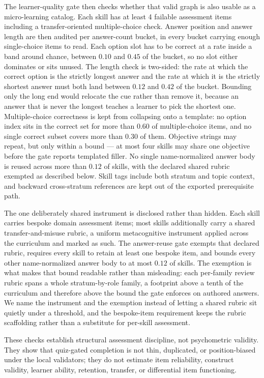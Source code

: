 \documentclass[
  english,
]{article}
\begin{document}
The learner-quality gate then checks whether that valid graph is also
usable as a micro-learning catalog. Each skill has at least 4 failable
assessment items including a transfer-oriented multiple-choice check.
Answer position and answer length are then audited per answer-count
bucket, in every bucket carrying enough single-choice items to read.
Each option slot has to be correct at a rate inside a band around
chance, between \(0.10\) and \(0.45\) of the bucket, so no slot either
dominates or sits unused. The length check is two-sided: the rate at
which the correct option is the strictly longest answer and the rate at
which it is the strictly shortest answer must both land between \(0.12\)
and \(0.42\) of the bucket. Bounding only the long end would relocate
the cue rather than remove it, because an answer that is never the
longest teaches a learner to pick the shortest one. Multiple-choice
correctness is kept from collapsing onto a template: no option index
sits in the correct set for more than \(0.60\) of multiple-choice items,
and no single correct subset covers more than \(0.30\) of them.
Objective strings may repeat, but only within a bound --- at most four
skills may share one objective before the gate reports templated filler.
No single name-normalized answer body is reused across more than
\(0.12\) of skills, with the declared shared rubric exempted as
described below. Skill tags include both stratum and topic context, and
backward cross-stratum references are kept out of the exported
prerequisite path.

The one deliberately shared instrument is disclosed rather than hidden.
Each skill carries bespoke domain assessment items; most skills
additionally carry a shared transfer-and-misuse rubric, a uniform
metacognitive instrument applied across the curriculum and marked as
such. The answer-reuse gate exempts that declared rubric, requires every
skill to retain at least one bespoke item, and bounds every other
name-normalized answer body to at most \(0.12\) of skills. The exemption
is what makes that bound readable rather than misleading: each
per-family review rubric spans a whole stratum-by-role family, a
footprint above a tenth of the curriculum and therefore above the bound
the gate enforces on authored answers. We name the instrument and the
exemption instead of letting a shared rubric sit quietly under a
threshold, and the bespoke-item requirement keeps the rubric scaffolding
rather than a substitute for per-skill assessment.

These checks establish structural assessment discipline, not
psychometric validity. They show that quiz-gated completion is not thin,
duplicated, or position-biased under the local validators; they do not
estimate item reliability, construct validity, learner ability,
retention, transfer, or differential item functioning.
\end{document}
